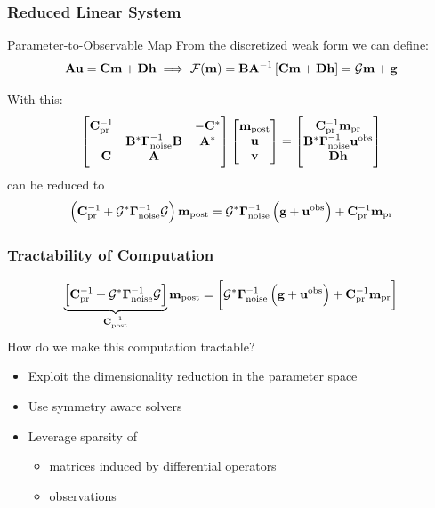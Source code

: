 \documentclass[
  pdf,
  10pt,
  xcolor={svgnames},
]{beamer}
\newcommand{\mc}[1]{\mathcal{#1}}
\newcommand{\mat}[1]{\mathbf{{#1}}}
\newcommand{\obs}{\mathbf{u}^{\rm obs}}
\begin{document}
\begin{frame}
  \frametitle{Reduced Linear System}
  \begin{block}{Parameter-to-Observable Map}
    From the discretized weak form we can define:
    \[
      \mat{A}\vb{u} = \mat{C} \vb{m} + \mat{D} \vb{h}
      \implies
      \mc{F}(\vb{m}) = \mat{B} \mat{A}^{-1} \left[
        \mat{C} \vb{m} + \mat{D} \vb{h}
      \right]
      = \mc{G} \vb{m} + \vb{g}
    \]
  \end{block}
  \pause
  With this:
  \[
    \begin{bmatrix}
      \mat{C}_{\rm pr}^{-1} & & -\mat{C}^* \\
       & \mat{B}^* \vb{\Gamma}_{\rm noise}^{-1} \mat{B} & \mat{A}^* \\
      -\mat{C} & \mat{A} & 
    \end{bmatrix}
    \begin{bmatrix} \vb{m}_{\rm post} \\ \vb{u} \\ \vb{v} \end{bmatrix}
    = \begin{bmatrix}
      \mat{C}_{\rm pr}^{-1} \vb{m}_{\rm pr} \\ 
      \mat{B}^* \vb{\Gamma}_{\rm noise}^{-1} \obs \\
      \mat{D} \vb{h}
    \end{bmatrix}
  \]
  can be reduced to
  \[
    \left(
      \mat{C}_{\rm pr}^{-1} + \mc{G}^* \vb{\Gamma}_{\rm noise}^{-1} \mc{G}
    \right)\vb{m}_{\rm post}
    = \mc{G}^* \vb{\Gamma}_{\rm noise}^{-1} \left( \vb{g} + \obs \right)
    + \mat{C}_{\rm pr}^{-1} \vb{m}_{\rm pr}
  \]
\end{frame}

\begin{frame}
  \frametitle{Tractability of Computation}
  \[
    \underbrace{\left[
        \mat{C}_{\rm pr}^{-1} + \mc{G}^* \vb{\Gamma}_{\rm noise}^{-1} \mc{G}
    \right]}_{\mat{C}_{\rm post}^{-1}}
    \vb{m}_{\rm post}
    =
    \left[
      \mc{G}^* \vb{\Gamma}_{\rm noise}^{-1} \left( \vb{g} + \obs \right)
      + \mat{C}_{\rm pr}^{-1} \vb{m}_{\rm pr}
    \right]
  \]
  How do we make this computation tractable?
  \pause
  \begin{itemize}
    \item Exploit the dimensionality reduction in the parameter space
    \item Use symmetry aware solvers
    \item Leverage sparsity of 
      \begin{itemize}
        \item matrices induced by differential operators
        \item observations
      \end{itemize}
  \end{itemize}
\end{frame}
\end{document}
